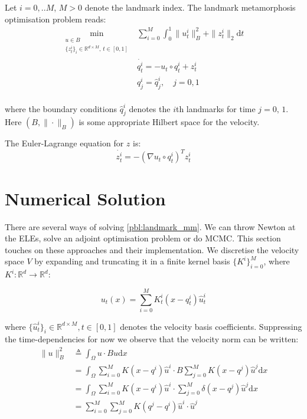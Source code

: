 \documentclass{article}
\newcommand{\norm}[2]{\| #1 \|_{ #2 }}
\newcommand{\bnorm}[1]{\norm{ #1 }{B}}
\newcommand{\ltwonorm}[1]{\norm{ #1 }{2}}
\newcommand{\diff}[1]{\text{d} #1}
\begin{document}
Let $i=0,..M$, $M>0$ denote the landmark index. The landmark metamorphosis 
optimisation problem reads:
\begin{subequations}\label{pbl:landmark_mm}
\begin{align}
\min_{\substack{u\in B\\ \{z^i_t\}_i \in \mathbb{R}^{d\times M},\, t\in[0,1]}} & \sum_{i=0}^M \int_0^1 \bnorm{u^i_t}^2 + \ltwonorm{z^i_t} \diff{t}\\
            & \dot{q^i_t} = - u_t \circ q^i_t + z^i_t \label{eq:ele_q} \\
            & q^i_j = \hat q^i_j, \quad j=0,1 \label{eq:ele_q_bcs}\\
\end{align}
\end{subequations}

where the boundary conditions $\hat q^i_j$ denotes the $i$th landmarks for time
$j=0,\,1$. Here $(B,\bnorm{\cdot})$ is some appropriate Hilbert space for the
velocity.

The Euler-Lagrange equation for $z$ is:
\begin{equation}\label{eq:ele_z}
\dot{z^i_t} = - (\nabla u_t \circ q^i_t)^T z^i_t
\end{equation}

\section{Numerical Solution}

There are several ways of solving \eqref{pbl:landmark_mm}. We can throw Newton
at the ELEs, solve an adjoint optimisation problem or do MCMC. This section
touches on these approaches and their implementation. We discretise the velocity
space $V$ by expanding and truncating it in a finite kernel basis
$\{K^i\}_{i=0}^M$, where $K^i : \mathbb{R}^d \rightarrow \mathbb{R}^d$:

\begin{equation}
u_t(x) = \sum_{i=0}^M K^i_t(x - q^i_t)\hat u^i_t \label{eq:ele_u_disc}
\end{equation}

where $\{\hat u^i_t\}_i \in \mathbb{R}^{d\times M}, t\in[0,1]$ denotes the
velocity basis coefficients. Suppressing the time-dependencies for now we
observe that the velocity norm can be written:
\begin{align*}
\bnorm{u}^2 & \triangleq \int_\Omega u\cdot Bu \diff{x}\\
            & = \int_\Omega\sum_{i=0}^M K(x-q^i)\hat u^i \cdot B \sum_{j=0}^M
            K(x-q^j)\hat u^j \diff{x}\\
            & = \int_\Omega \sum_{i=0}^M K(x-q^i)\hat u^i \cdot \sum_{j=0}^M
            \delta (x-q^j)\hat u^j \diff{x}\\
            & = \sum_{i=0}^M \sum_{j=0}^M K(q^j-q^i)\hat u^i \cdot\hat u^j
\end{align*}
\end{document}
